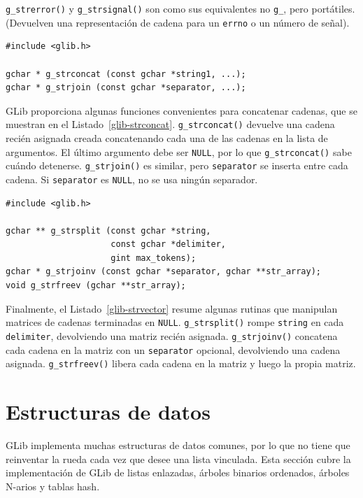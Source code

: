 \lstinline{g_strerror()} y \lstinline{g_strsignal()} son como sus equivalentes no \lstinline{g_}, pero portátiles. (Devuelven una representación de cadena para un \lstinline{errno} o un número de señal).

\begin{lstlisting}[style=GLib/GTK, caption={Concatenar cadenas}, label=glib-strconcat]
#include <glib.h>

gchar * g_strconcat (const gchar *string1, ...);
gchar * g_strjoin (const gchar *separator, ...);
\end{lstlisting}

GLib proporciona algunas funciones convenientes para concatenar cadenas, que se muestran en el Listado~\ref{glib-strconcat}. \lstinline{g_strconcat()} devuelve una cadena recién asignada creada concatenando cada una de las cadenas en la lista de argumentos. El último argumento debe ser \lstinline{NULL}, por lo que \lstinline{g_strconcat()} sabe cuándo detenerse. \lstinline{g_strjoin()} es similar, pero \lstinline{separator} se inserta entre cada cadena. Si \lstinline {separator} es \lstinline{NULL}, no se usa ningún separador.

\begin{lstlisting}[style=GLib/GTK, caption={Manipulación de vectores de cadena terminados en \lstinline{NULL}}, label=glib-strvector]
#include <glib.h>

gchar ** g_strsplit (const gchar *string,
                     const gchar *delimiter,
                     gint max_tokens);
gchar * g_strjoinv (const gchar *separator, gchar **str_array);
void g_strfreev (gchar **str_array);
\end{lstlisting}

Finalmente, el Listado~\ref{glib-strvector} resume algunas rutinas que manipulan matrices de cadenas terminadas en \lstinline{NULL}. \lstinline{g_strsplit()} rompe \lstinline{string} en cada \lstinline{delimiter}, devolviendo una matriz recién asignada. \lstinline{g_strjoinv()} concatena cada cadena en la matriz con un \lstinline{separator} opcional, devolviendo una cadena asignada. \lstinline{g_strfreev()} libera cada cadena en la matriz y luego la propia matriz.

\section{Estructuras de datos}

GLib implementa muchas estructuras de datos comunes, por lo que no tiene que reinventar la rueda cada vez que desee una lista vinculada. Esta sección cubre la implementación de GLib de listas enlazadas, árboles binarios ordenados, árboles N-arios y tablas hash.


